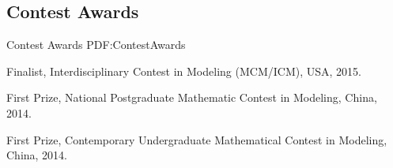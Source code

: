 \documentclass[letterpaper,10pt,oneside]{article}
\newcommand{\CVNote}{CV updated on {\DatestampYM{2023}{06}} }
\begin{document}
\begin{body}

\section
{Contest Awards}
{Contest Awards}
{PDF:ContestAwards}

\BulletItem
Finalist, Interdisciplinary Contest in Modeling (MCM/ICM), USA, 2015.

\BulletItem
First Prize, National Postgraduate Mathematic Contest in Modeling, China, 2014.

\BulletItem
First Prize, Contemporary Undergraduate Mathematical Contest in Modeling, China, 2014.













\end{body}



\label{LastPage}~
\end{document}

